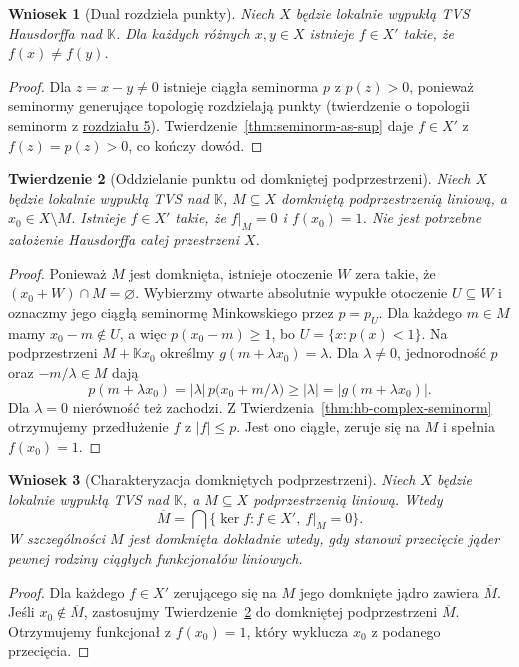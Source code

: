 \documentclass[11pt,a4paper]{article}
\numberwithin{equation}{section}
\theoremstyle{plain}
\newtheorem{twierdzenie}{Twierdzenie}[section]
\newtheorem{wniosek}[twierdzenie]{Wniosek}
\theoremstyle{definition}
\theoremstyle{remark}
\newcommand{\K}{\mathbb K}
\begin{document}
\begin{wniosek}[Dual rozdziela punkty]\label{cor:dual-separates}
Niech $X$ będzie lokalnie wypukłą TVS Hausdorffa
nad $\K$. Dla każdych różnych $x,y\in X$ istnieje
$f\in X'$ takie, że $f(x)\ne f(y)$.
\end{wniosek}
\begin{proof}
Dla $z=x-y\ne0$ istnieje ciągła seminorma $p$
z $p(z)>0$, ponieważ seminormy generujące topologię
rozdzielają punkty (twierdzenie o topologii seminorm z \hyperref[sec:lokalnie-wypukle]{rozdziału 5}).
Twierdzenie~\ref{thm:seminorm-as-sup} daje $f\in X'$
z $f(z)=p(z)>0$, co kończy dowód.
\end{proof}

\begin{twierdzenie}[Oddzielanie punktu od domkniętej podprzestrzeni]
\label{thm:point-closed-subspace}
Niech $X$ będzie lokalnie wypukłą TVS nad $\K$,
$M\subseteq X$ domkniętą podprzestrzenią liniową,
a $x_0\in X\setminus M$. Istnieje $f\in X'$
takie, że $f|_M=0$ i $f(x_0)=1$.
Nie jest potrzebne założenie Hausdorffa całej przestrzeni $X$.
\end{twierdzenie}
\begin{proof}
Ponieważ $M$ jest domknięta, istnieje otoczenie
$W$ zera takie, że $(x_0+W)\cap M=\varnothing$.
Wybierzmy otwarte absolutnie wypukłe otoczenie
$U\subseteq W$ i oznaczmy jego ciągłą seminormę
Minkowskiego przez $p=p_U$.
Dla każdego $m\in M$ mamy $x_0-m\notin U$,
a więc $p(x_0-m)\ge1$, bo $U=\{x:p(x)<1\}$.
Na podprzestrzeni $M+\K x_0$ określmy
$g(m+\lambda x_0)=\lambda$. Dla $\lambda\ne0$,
jednorodność $p$ oraz $-m/\lambda\in M$ dają
\[
 p(m+\lambda x_0)=|\lambda|\,
 p\bigl(x_0+m/\lambda\bigr)\ge|\lambda|
 =|g(m+\lambda x_0)|.
\]
Dla $\lambda=0$ nierówność też zachodzi.
Z Twierdzenia~\ref{thm:hb-complex-seminorm} otrzymujemy
przedłużenie $f$ z $|f|\le p$. Jest ono ciągłe,
zeruje się na $M$ i spełnia $f(x_0)=1$.
\end{proof}

\begin{wniosek}[Charakteryzacja domkniętych podprzestrzeni]
\label{cor:closed-as-annihilator}
Niech $X$ będzie lokalnie wypukłą TVS nad $\K$,
a $M\subseteq X$ podprzestrzenią liniową. Wtedy
\[
 \overline M=\bigcap\{\ker f:f\in X',\ f|_M=0\}.
\]
W szczególności $M$ jest domknięta dokładnie wtedy,
gdy stanowi przecięcie jąder pewnej rodziny ciągłych
funkcjonałów liniowych.
\end{wniosek}
\begin{proof}
Dla każdego $f\in X'$ zerującego się na $M$
jego domknięte jądro zawiera $\overline M$.
Jeśli $x_0\notin\overline M$, zastosujmy
Twierdzenie~\ref{thm:point-closed-subspace}
do domkniętej podprzestrzeni $\overline M$.
Otrzymujemy funkcjonał z $f(x_0)=1$, który
wyklucza $x_0$ z podanego przecięcia.
\end{proof}
\end{document}
